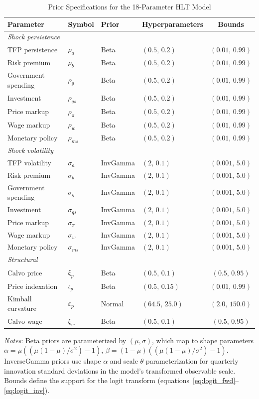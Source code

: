 \documentclass[12pt]{article}
\theoremstyle{plain}
\theoremstyle{definition}
\theoremstyle{remark}
\newcommand{\tablenotes}[1]{%
  \par\vspace{0.5em}%
  \noindent\begin{minipage}{\textwidth}%
  \raggedright\footnotesize #1%
  \end{minipage}\par%
}
\begin{document}
\begin{table}[htbp]
\centering
\caption{Prior Specifications for the 18-Parameter HLT Model}
\label{tab:prior_specs}
\begin{tabular}{llllc}
\toprule
Parameter & Symbol & Prior & Hyperparameters & Bounds \\
\midrule
\multicolumn{5}{l}{\textit{Shock persistence}} \\
TFP persistence & $\rho_a$ & Beta & $(0.5,\, 0.2)$ & $(0.01,\, 0.99)$ \\
Risk premium & $\rho_b$ & Beta & $(0.5,\, 0.2)$ & $(0.01,\, 0.99)$ \\
Government spending & $\rho_g$ & Beta & $(0.5,\, 0.2)$ & $(0.01,\, 0.99)$ \\
Investment & $\rho_{qs}$ & Beta & $(0.5,\, 0.2)$ & $(0.01,\, 0.99)$ \\
Price markup & $\rho_\pi$ & Beta & $(0.5,\, 0.2)$ & $(0.01,\, 0.99)$ \\
Wage markup & $\rho_w$ & Beta & $(0.5,\, 0.2)$ & $(0.01,\, 0.99)$ \\
Monetary policy & $\rho_{ms}$ & Beta & $(0.5,\, 0.2)$ & $(0.01,\, 0.99)$ \\
\midrule
\multicolumn{5}{l}{\textit{Shock volatility}} \\
TFP volatility & $\sigma_a$ & InvGamma & $(2,\, 0.1)$ & $(0.001,\, 5.0)$ \\
Risk premium & $\sigma_b$ & InvGamma & $(2,\, 0.1)$ & $(0.001,\, 5.0)$ \\
Government spending & $\sigma_g$ & InvGamma & $(2,\, 0.1)$ & $(0.001,\, 5.0)$ \\
Investment & $\sigma_{qs}$ & InvGamma & $(2,\, 0.1)$ & $(0.001,\, 5.0)$ \\
Price markup & $\sigma_\pi$ & InvGamma & $(2,\, 0.1)$ & $(0.001,\, 5.0)$ \\
Wage markup & $\sigma_w$ & InvGamma & $(2,\, 0.1)$ & $(0.001,\, 5.0)$ \\
Monetary policy & $\sigma_{ms}$ & InvGamma & $(2,\, 0.1)$ & $(0.001,\, 5.0)$ \\
\midrule
\multicolumn{5}{l}{\textit{Structural}} \\
Calvo price & $\xi_p$ & Beta & $(0.5,\, 0.1)$ & $(0.5,\, 0.95)$ \\
Price indexation & $\iota_p$ & Beta & $(0.5,\, 0.15)$ & $(0.01,\, 0.99)$ \\
Kimball curvature & $\varepsilon_p$ & Normal & $(64.5,\, 25.0)$ & $(2.0,\, 150.0)$ \\
Calvo wage & $\xi_w$ & Beta & $(0.5,\, 0.1)$ & $(0.5,\, 0.95)$ \\
\bottomrule
\end{tabular}
\smallskip
\tablenotes{\textit{Notes}: Beta priors are parameterized by $(\mu, \sigma)$, which map to shape parameters $\alpha = \mu((\mu(1-\mu)/\sigma^2) - 1)$, $\beta = (1-\mu)((\mu(1-\mu)/\sigma^2) - 1)$. InverseGamma priors use shape $\alpha$ and scale $\theta$ parameterization for quarterly innovation standard deviations in the model's transformed observable scale. Bounds define the support for the logit transform (equations~\ref{eq:logit_fwd}--\ref{eq:logit_inv}).}
\end{table}
\end{document}
